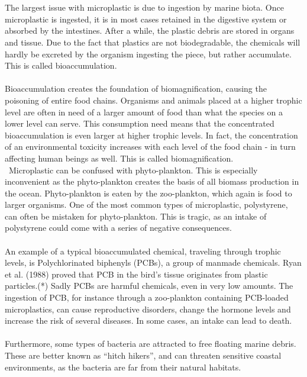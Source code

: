 \\\\
The largest issue with microplastic is due to ingestion by marine biota. Once microplastic is ingested, it is in most cases retained in the digestive system or absorbed by the intestines. After a while, the plastic debris are stored in organs and tissue. Due to the fact that plastics are not biodegradable, the chemicals will hardly be excreted by the organism ingesting the piece, but rather accumulate. This is called bioaccumulation. 
\\\\
Bioaccumulation creates the foundation of biomagnification, causing the poisoning of entire food chains. Organisms and animals placed at a higher trophic level are often in need of a larger amount of food than what the species on a lower level can serve. This consumption need means that the concentrated bioaccumulation is even larger at higher trophic levels. In fact, the concentration of an environmental toxicity increases with each level of the food chain - in turn affecting human beings as well. This is called biomagnification. 
\\\
Microplastic can be confused with phyto-plankton. This is especially inconvenient as the phyto-plankton creates the basis of all biomass production in the ocean. Phyto-plankton is eaten by the zoo-plankton, which again is food to larger organisms. One of the most common types of microplastic, polystyrene, can often be mistaken for phyto-plankton. This is tragic, as an intake of polystyrene could come with a series of negative consequences. %
\\\\
An example of a typical bioaccumulated chemical, traveling through trophic levels, is Polychlorinated biphenyls (PCBs), a group of manmade chemicals. Ryan et al. (1988) proved that PCB in the bird's tissue originates from plastic particles.(*) Sadly PCBs are harmful chemicals, even in very low amounts. The ingestion of PCB, for instance through a zoo-plankton containing PCB-loaded microplastics, can cause reproductive disorders, change the hormone levels and increase the risk of several diseases. In some cases, an intake can lead to death. %
\\\\
Furthermore, some types of bacteria are attracted to free floating marine debris. These are better known as “hitch hikers”, and can threaten sensitive coastal environments, as the bacteria are far from their natural habitats. 
